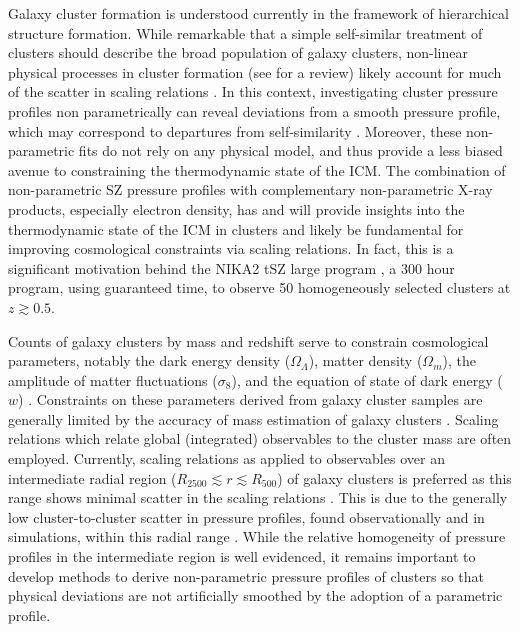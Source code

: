\documentclass[onecolumn,traditabstract]{aa}
\begin{document}
Galaxy cluster formation is understood currently in the framework of hierarchical structure formation\citep[e.g.,][]{press1974}.
While remarkable that a simple self-similar treatment of clusters \citep{kaiser1986} should describe the broad population of
galaxy clusters, non-linear physical processes in cluster formation (see \citet{kravtsov2012} for a review) likely account
for much of the scatter in scaling relations \citep[e.g.,][]{battaglia2012}. In this context, investigating cluster pressure profiles
non parametrically can reveal deviations from a smooth pressure profile, which may correspond to departures from self-similarity
\citep{basu2010}. Moreover, these non-parametric fits do not rely on any physical model, and thus provide a less biased avenue
to constraining the thermodynamic state of the ICM. The combination of non-parametric SZ pressure profiles with complementary
non-parametric X-ray products, especially electron density, has \citep[e.g][]{basu2010,planck2013a,ruppin2017}
and will provide insights into the thermodynamic state of the ICM in clusters and likely be fundamental for improving cosmological
constraints via scaling relations. In fact, this is a significant motivation behind the NIKA2 tSZ large program \citep{comis2016},
a 300 hour program, using guaranteed time, to observe 50 homogeneously selected clusters at $z \gtrsim 0.5$.


Counts of galaxy clusters by mass and redshift serve to constrain cosmological parameters, notably the dark energy density
($\Omega_{\Lambda}$), matter density ($\Omega_{m}$), the amplitude of matter fluctuations ($\sigma_8$), and the equation of state of
dark energy ($w$) \citep{planck2016_szc}. Constraints on these
parameters derived from galaxy cluster samples are generally limited by the accuracy of mass estimation of 
galaxy clusters \citep[e.g.,][]{hasselfield2013, dehaan2016}. Scaling relations which relate global (integrated) observables
to the cluster mass are often employed. Currently, scaling relations as applied to observables over an intermediate radial
region ($R_{2500} \lesssim r \lesssim R_{500}$) of galaxy clusters is preferred as this range shows minimal scatter in the
scaling relations \citep[e.g.,][]{kravtsov2012}. This is due
to the generally low cluster-to-cluster scatter in pressure profiles, found observationally and in simulations,
within this radial range \citep[e.g.,][]{borgani2004,nagai2007,arnaud2010,bonamente2012,planck2013a,sayers2013}.
While the relative homogeneity of pressure profiles in the intermediate region is well evidenced, it remains important to
develop methods to derive non-parametric pressure profiles of clusters so that physical deviations are not artificially
smoothed by the adoption of a parametric profile. 
\end{document}
